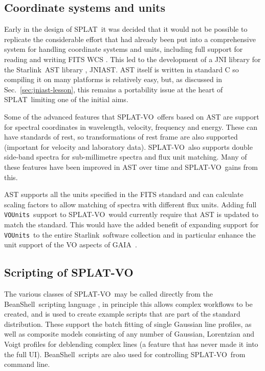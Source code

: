 \documentclass[final,authoryear,5p,times,twocolumn]{elsarticle}
\newcommand{\vounits}{\texttt{VOUnits}}
\newcommand{\splat}{\textsf{\small SPLAT}}
\newcommand{\splatvo}{{\textsf{\small{SPLAT-VO}}}}
\newcommand{\gaia}{\textsf{\small GAIA}}
\newcommand{\Starlink}{\textsf{\small Starlink}}
\newcommand{\beanshell}{\textsf{\small BeanShell}}
\newcommand{\ascl}[1]{\href{http://www.ascl.net/#1}{ascl:#1}}
\begin{document}
\subsection{Coordinate systems and units}

Early in the design of \splat\ it was decided that it would not be possible to
replicate the considerable effort that had already been put into a
comprehensive system for handling coordinate systems and units, including full
support for reading and writing FITS WCS \citep{2006A&A...446..747G}. This led
to the development of a JNI library for the \Starlink\ AST library
\citep[][\ascl{1404.016}]{1998ASPC..145...41W,2012ASPC..461..825B}, JNIAST. AST
itself is written in standard C so compiling it on many platforms is relatively
easy, but, as discussed in Sec.\ \ref{sec:jniast-lesson}, this remains a
portability issue at the heart of \splat\ limiting one of the initial aims.

Some of the advanced features that \splatvo\ offers based on AST are support
for spectral coordinates in wavelength, velocity, frequency and energy. These
can have standards of rest, so transformations of rest frame are also supported
(important for velocity and laboratory data). \splatvo\ also supports double
side-band spectra for sub-millimetre spectra and flux unit matching. Many of
these features have been improved in AST over time and \splatvo\ gains from
this.

AST supports all the units specified in the FITS standard
\citep{2010A&A...524A..42P} and can calculate scaling factors to allow matching
of spectra with different flux units. Adding full \vounits\ support
\citep{vounits} to \splatvo\ would currently require that AST is updated to
match the standard. This would have the added benefit of expanding support for
\vounits\ to the entire \Starlink\ software collection and in particular
enhance the unit support of the VO aspects of \gaia\
\citep{2009ASPC..411..575D}.

\subsection{Scripting of SPLAT-VO}

The various classes of \splatvo\ may be called directly from the \beanshell\
scripting language \citep{niemeyer2013learning}, in principle this allows
complex workflows to be created, and is used to create example scripts that are
part of the standard distribution. These support the batch fitting of single
Gaussian line profiles, as well as composite models consisting of any number of
Gaussian, Lorentzian and Voigt profiles for deblending complex lines (a feature
that has never made it into the full UI). \beanshell\  scripts are also used
for controlling \splatvo\ from command line.
\end{document}
